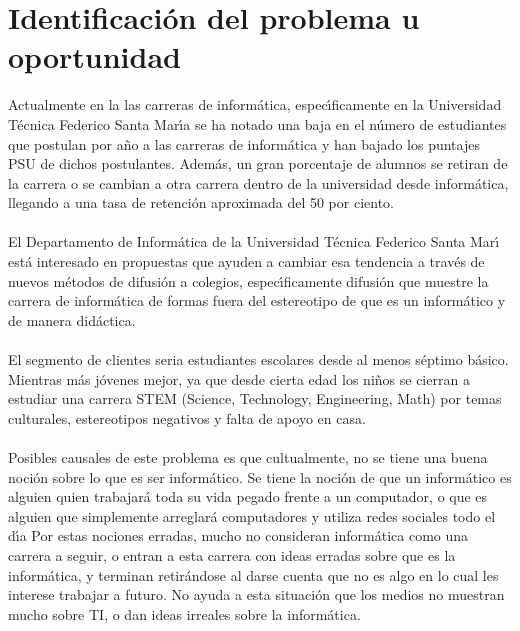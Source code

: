 \documentclass[letterpaper,12pt]{report} %
\numberwithin{equation}{section} %
\numberwithin{figure}{section} %
\numberwithin{table}{section} %
\begin{document}
\section{Identificaci\'on del problema u oportunidad}
Actualmente en la las carreras de inform\'atica, espec\'{\i}ficamente en la Universidad T\'ecnica Federico Santa Mar\'{\i}a se ha notado una baja en el n\'umero de estudiantes que postulan por a\~no a las carreras de inform\'atica y han bajado los puntajes PSU de dichos postulantes. Adem\'as, un gran porcentaje de alumnos se retiran de la carrera o se cambian a otra carrera dentro de la universidad desde inform\'atica, llegando a una tasa de retenci\'on aproximada del 50 por ciento.\\~\\
El Departamento de Inform\'atica de la Universidad T\'ecnica Federico Santa Mar\'{\i} est\'a interesado en propuestas que ayuden a cambiar esa tendencia a trav\'es de nuevos m\'etodos de difusi\'on a colegios, espec\'{\i}ficamente difusi\'on que muestre la carrera de inform\'atica de formas fuera del estereotipo de que es un inform\'atico y de manera did\'actica.\\~\\
El segmento de clientes seria estudiantes escolares desde al menos s\'eptimo b\'asico. Mientras m\'as j\'ovenes mejor, ya que desde cierta edad los ni\~nos se cierran a estudiar una carrera STEM (Science, Technology, Engineering, Math) por temas culturales, estereotipos negativos y falta de apoyo en casa.\\~\\
Posibles causales de este problema es que cultualmente, no se tiene una buena noci\'on sobre lo que es ser inform\'atico. Se tiene la noci\'on de que un inform\'atico es alguien quien trabajar\'a toda su vida pegado frente a un computador, o que es alguien que simplemente arreglar\'a computadores y utiliza redes sociales todo el d\'{\i}a Por estas nociones erradas, mucho no consideran inform\'atica como una carrera a seguir, o entran a esta carrera con ideas erradas sobre que es la inform\'atica, y terminan retir\'andose al darse cuenta que no es algo en lo cual les interese trabajar a futuro. No ayuda a esta situaci\'on que los medios no muestran mucho sobre TI, o dan ideas irreales sobre la inform\'atica.\\~\\
\end{document}
